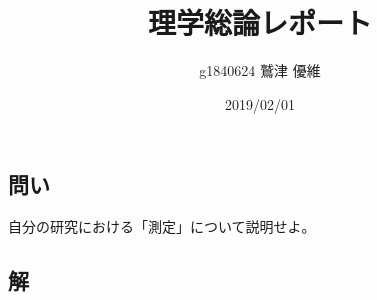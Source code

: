 \documentclass[10pt]{ujarticle}
\title{理学総論レポート}
\author{g1840624 鷲津 優維}
\date{2019/02/01}
\begin{document}
\section{}
\subsection{問い}
自分の研究における「測定」について説明せよ。

\subsection{解}
\end{document}
